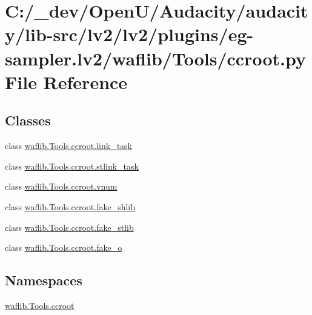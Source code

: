 \hypertarget{lv2_2plugins_2eg-sampler_8lv2_2waflib_2_tools_2ccroot_8py}{}\section{C\+:/\+\_\+dev/\+Open\+U/\+Audacity/audacity/lib-\/src/lv2/lv2/plugins/eg-\/sampler.lv2/waflib/\+Tools/ccroot.py File Reference}
\label{lv2_2plugins_2eg-sampler_8lv2_2waflib_2_tools_2ccroot_8py}
\subsection*{Classes}
\begin{DoxyCompactItemize}
\item 
class \hyperlink{classwaflib_1_1_tools_1_1ccroot_1_1link__task}{waflib.\+Tools.\+ccroot.\+link\+\_\+task}
\item 
class \hyperlink{classwaflib_1_1_tools_1_1ccroot_1_1stlink__task}{waflib.\+Tools.\+ccroot.\+stlink\+\_\+task}
\item 
class \hyperlink{classwaflib_1_1_tools_1_1ccroot_1_1vnum}{waflib.\+Tools.\+ccroot.\+vnum}
\item 
class \hyperlink{classwaflib_1_1_tools_1_1ccroot_1_1fake__shlib}{waflib.\+Tools.\+ccroot.\+fake\+\_\+shlib}
\item 
class \hyperlink{classwaflib_1_1_tools_1_1ccroot_1_1fake__stlib}{waflib.\+Tools.\+ccroot.\+fake\+\_\+stlib}
\item 
class \hyperlink{classwaflib_1_1_tools_1_1ccroot_1_1fake__o}{waflib.\+Tools.\+ccroot.\+fake\+\_\+o}
\end{DoxyCompactItemize}
\subsection*{Namespaces}
\begin{DoxyCompactItemize}
\item 
 \hyperlink{namespacewaflib_1_1_tools_1_1ccroot}{waflib.\+Tools.\+ccroot}
\end{DoxyCompactItemize}
